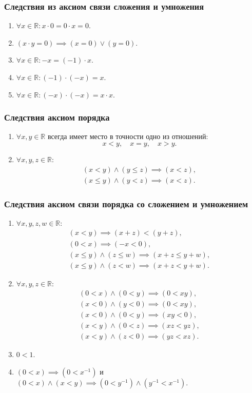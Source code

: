 \documentclass[12pt]{report}
\theoremstyle{plain}
\newcommand{\R}{\mathbb R}
\begin{document}
\subsubsection{Следствия из аксиом связи сложения и умножения}
\begin{enumerate}
\item $\forall x \in \R: x \cdot 0 = 0 \cdot x = 0$.
\item $(x \cdot y = 0) \implies (x = 0) \lor (y = 0)$.
\item $\forall x \in \R: -x = (-1) \cdot x$.
\item $\forall x \in \R: (-1) \cdot (-x) = x$.
\item $\forall x \in \R: (-x) \cdot (-x) = x \cdot x$.
\end{enumerate}

\subsubsection{Следствия аксиом порядка}
\begin{enumerate}
\item $\forall x, y \in \R$ всегда имеет место в точности одно из отношений:
$$
x < y, \quad x = y, \quad x > y.
$$
\item $\forall x, y, z \in \R$:
  \begin{gather*}
    (x < y) \land (y \le z) \implies (x < z), \\
    (x \le y) \land (y < z) \implies (x < z).
  \end{gather*}
\end{enumerate}

\subsubsection{Следствия аксиом связи порядка со сложением и умножением}
\begin{enumerate}
\item $\forall x, y, z, w \in \R$:
  \begin{gather*}
    (x < y) \implies (x + z) < (y + z), \\
    (0 < x) \implies (-x < 0), \\
    (x \le y) \land (z \le w) \implies (x + z \le y + w), \\
    (x \le y) \land  (z < w) \implies (x + z < y + w).
  \end{gather*}
\item $\forall x, y, z \in \R$:
  \begin{gather*}
    (0 < x) \land (0 < y) \implies (0 < xy), \\
    (x < 0) \land (y < 0) \implies (0 < xy), \\
    (x < 0) \land (0 < y) \implies (xy < 0), \\
    (x < y) \land (0 < z) \implies (xz < yz), \\
    (x < y) \land (z < 0) \implies (yz < xz).
  \end{gather*}
\item $0 < 1$.
\item $(0 < x) \implies (0 < x^{-1})$ и $(0 < x) \land (x < y) \implies (0 < y^{-1}) \land (y^{-1} < x^{-1}).$
\end{enumerate}
\end{document}
